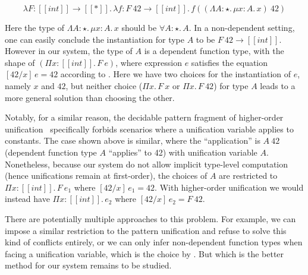 \begin{equation*}
    \lambda F : [[int]] \rightarrow [[*]].\, \lambda f : F~42 \rightarrow [[int]].\, f ((\Lambda A : \star.\,\mu x : A.\, x)~42)
\end{equation*}

Here the type of $\Lambda A : \star.\,\mu x : A.\, x$ should be $\forall A : \star.\, A$.
In a non-dependent setting, one can easily conclude the instantiation for type $A$ to be
$F~42 \rightarrow [[int]]$. However in our system, the type of $A$ is a
dependent function type, with the shape of $(\Pi x : [[int]].\, F~e)$,
where expression $e$ satisfies the equation $[42/x]\,e = 42$ according to .
Here we have two choices for the instantiation of $e$, namely $x$ and $42$,
but neither choice ($\Pi x.\, F~x$ or $\Pi x.\, F~42$) for type $A$ leads to a more general
solution than choosing the other.

Notably, for a similar reason, the decidable pattern
fragment of higher-order unification~\cite{patternunification} specifically
forbids scenarios where a unification variable applies to constants.
The case shown above is similar, where the ``application'' is $A~42$
(dependent function type $A$ ``applies'' to 42) with unification variable $A$.
Nonetheless, because our system do not allow implicit type-level
computation (hence unifications remain at first-order),
the choices of $A$ are restricted to $\Pi x : [[int]].\,F~e_1$ where $[42/x]\,e_1 = 42$.
With higher-order unification we would instead
have $\Pi x : [[int]].\, e_2$ where $[42/x]\,e_2 = F~42$.

There are potentially multiple approaches to this problem. For example, we can
impose a similar restriction to the pattern unification and refuse to solve
this kind of conflicts entirely, or we can only infer non-dependent function types when
facing a unification variable, which is the choice by \citet{dh}. But which is
the better method for our system remains to be studied.



